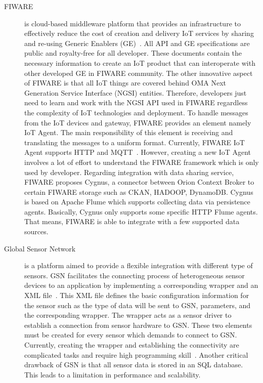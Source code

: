 \begin{description}
    \item [FIWARE] is cloud-based middleware platform that provides an infrastructure to effectively reduce the cost of creation and delivery IoT services by sharing and re-using Generic Enablers (GE)~\cite{zahariadis2014fiware}. All API and GE specifications are public and royalty-free for all developer. These documents contain the necessary information to create an IoT product that can interoperate with other developed GE in FIWARE community. The other innovative aspect of FIWARE is that all IoT things are covered behind OMA Next Generation Service Interface (NGSI) entities. Therefore, developers just need to learn and work with the NGSI API used in FIWARE regardless the complexity of IoT technologies and deployment. To handle messages from the IoT devices and gateway, FIWARE provides an element namely IoT Agent. The main responsibility of this element is receiving and translating the messages to a uniform format. Currently, FIWARE IoT Agent supports HTTP and MQTT~\cite{iota-fiware-iot-stack}. However, creating a new IoT Agent involves a lot of effort to understand the FIWARE framework  which is only used by developer. Regarding integration with data sharing service, FIWARE proposes Cygnus, a connector between Orion Context Broker to certain FIWARE storage such as CKAN, HADOOP, DynamoDB. Cygnus is based on Apache Flume  which supports collecting data via persistence agents. Basically, Cygnus only supports some specific HTTP Flume agents. That means, FIWARE is able to integrate with a few supported data sources.
    
    \item [Global Sensor Network] is a platform aimed to provide a flexible integration with different type of sensors. GSN facilitates the connecting process of heterogeneous sensor devices to an application by implementing a corresponding wrapper and an XML file~\cite{Aberer2006}. This XML file defines the basic configuration information for the sensor such as the type of data will be sent to GSN, parameters, and the corresponding wrapper. The wrapper acts as a sensor driver to establish a connection from sensor hardware to GSN. These two elements must be created for every sensor which demands to connect to GSN. Currently, creating the wrapper and establishing the connectivity are complicated tasks and require high programming skill~\cite{gsn_2013}. Another critical drawback of GSN is that all sensor data is stored in an SQL database. This leads to a limitation in performance and scalability.
    

\end{description}
